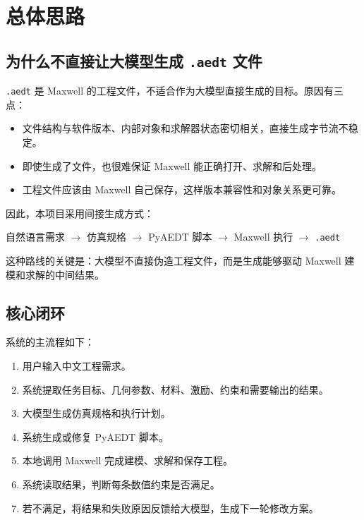 \documentclass[12pt,a4paper]{ctexart}
\begin{document}
\section{总体思路}

\subsection{为什么不直接让大模型生成 \texttt{.aedt} 文件}

\texttt{.aedt} 是 Maxwell 的工程文件，不适合作为大模型直接生成的目标。原因有三点：

\begin{itemize}
  \item 文件结构与软件版本、内部对象和求解器状态密切相关，直接生成字节流不稳定。
  \item 即使生成了文件，也很难保证 Maxwell 能正确打开、求解和后处理。
  \item 工程文件应该由 Maxwell 自己保存，这样版本兼容性和对象关系更可靠。
\end{itemize}

因此，本项目采用间接生成方式：

\begin{center}
自然语言需求 $\rightarrow$ 仿真规格 $\rightarrow$ PyAEDT 脚本 $\rightarrow$ Maxwell 执行 $\rightarrow$ \texttt{.aedt}
\end{center}

这种路线的关键是：大模型不直接伪造工程文件，而是生成能够驱动 Maxwell 建模和求解的中间结果。

\subsection{核心闭环}

系统的主流程如下：

\begin{enumerate}
  \item 用户输入中文工程需求。
  \item 系统提取任务目标、几何参数、材料、激励、约束和需要输出的结果。
  \item 大模型生成仿真规格和执行计划。
  \item 系统生成或修复 PyAEDT 脚本。
  \item 本地调用 Maxwell 完成建模、求解和保存工程。
  \item 系统读取结果，判断每条数值约束是否满足。
  \item 若不满足，将结果和失败原因反馈给大模型，生成下一轮修改方案。
\end{enumerate}
\end{document}
